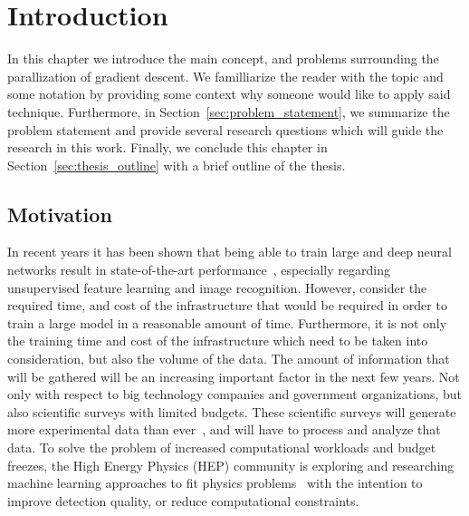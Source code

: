 %
%
%

\chapter{Introduction}
\label{chapter:introduction}

In this chapter we introduce the main concept, and problems surrounding the parallization of gradient descent. We familliarize the reader with the topic and some notation by providing some context why someone would like to apply said technique. Furthermore, in Section~\ref{sec:problem_statement}, we summarize the problem statement and provide several research questions which will guide the research in this work. Finally, we conclude this chapter in Section~\ref{sec:thesis_outline} with a brief outline of the thesis.

\section{Motivation}
\label{sec:motivation}

In recent years it has been shown that being able to train large and deep neural networks result in state-of-the-art performance~\cite{wu2016google, dean2012large}, especially regarding unsupervised feature learning and image recognition. However, consider the required time, and cost of the infrastructure that would be required in order to train a large model in a reasonable amount of time. Furthermore, it is not only the training time and cost of the infrastructure which need to be taken into consideration, but also the volume of the data. The amount of information that will be gathered will be an increasing important factor in the next few years. Not only with respect to big technology companies and government organizations, but also scientific surveys with limited budgets. These scientific surveys will generate more experimental data than ever~\cite{hllhcdesignreport, ivezic2008lsst}, and will have to process and analyze that data. To solve the problem of increased computational workloads and budget freezes, the High Energy Physics (HEP) community is exploring and researching machine learning approaches to fit physics problems~\cite{bian2016recent, de2017learning, louppe2016learning} with the intention to improve detection quality, or reduce computational constraints.\\

